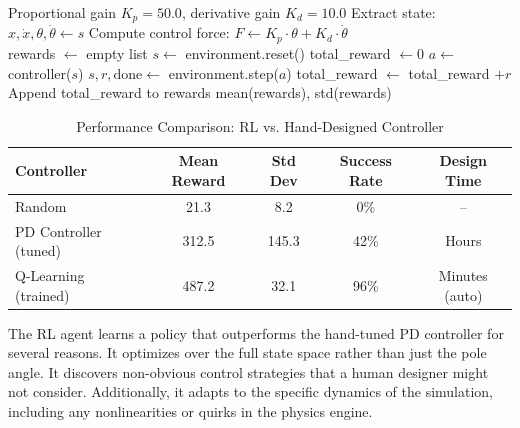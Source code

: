\begin{algorithm}[htbp]
\caption{PD Controller for CartPole}
\label{alg:pd_controller}
\begin{algorithmic}[1]
\Require Proportional gain $K_p = 50.0$, derivative gain $K_d = 10.0$
    \State Extract state: $x, \dot{x}, \theta, \dot{\theta} \gets s$
    \State Compute control force: $F \gets K_p \cdot \theta + K_d \cdot \dot{\theta}$
        \State {} 
    \Else
        \State {} 
    \EndIf
\EndFunction
\\
    \State rewards $\gets$ empty list
        \State $s \gets$ environment.reset()
        \State total\_reward $\gets 0$
            \State $a \gets$ controller($s$)
            \State $s, r, \text{done} \gets$ environment.step($a$)
            \State total\_reward $\gets$ total\_reward $+ r$
        \EndWhile
        \State Append total\_reward to rewards
    \EndFor
    \State \Return mean(rewards), std(rewards)
\EndFunction
\end{algorithmic}
\end{algorithm}

\begin{table}[htbp]
\centering
\caption{Performance Comparison: RL vs. Hand-Designed Controller}
\label{tab:performance_comparison}
\begin{tabular}{@{}lcccc@{}}
\toprule
\textbf{Controller} & \textbf{Mean Reward} & \textbf{Std Dev} & \textbf{Success Rate} & \textbf{Design Time} \\
\midrule
Random & 21.3 & 8.2 & 0\% & -- \\
PD Controller (tuned) & 312.5 & 145.3 & 42\% & Hours \\
Q-Learning (trained) & 487.2 & 32.1 & 96\% & Minutes (auto) \\
\bottomrule
\end{tabular}
\end{table}

The RL agent learns a policy that outperforms the hand-tuned PD controller for several reasons. It optimizes over the full state space rather than just the pole angle. It discovers non-obvious control strategies that a human designer might not consider. Additionally, it adapts to the specific dynamics of the simulation, including any nonlinearities or quirks in the physics engine.

